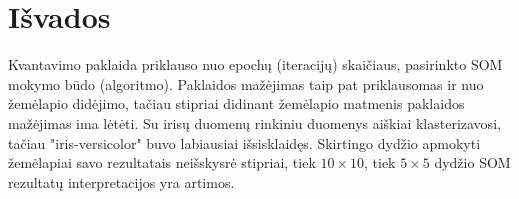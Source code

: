 \documentclass{VUMIFPSbakalaurinis}
\begin{document}
\begin{table}[]
  \centering
  \caption{1 mokymo būdu mokyto 10x10 dydžio SOM žemėlapis po 1000 epochų}{
  }
  \label{tab:10x10-1}
\end{table}


\section{Išvados}

Kvantavimo paklaida priklauso nuo epochų (iteracijų) skaičiaus,
pasirinkto SOM mokymo būdo (algoritmo). Paklaidos mažėjimas 
taip pat priklausomas ir nuo žemėlapio didėjimo, tačiau stipriai 
didinant žemėlapio matmenis paklaidos mažėjimas ima lėtėti. 
Su irisų duomenų rinkiniu duomenys aiškiai klasterizavosi,
tačiau "iris-versicolor" buvo labiausiai išsisklaidęs. Skirtingo
dydžio apmokyti žemėlapiai savo rezultatais neišskysrė stipriai,
tiek $10 \times 10$, tiek $5 \times 5$ dydžio SOM rezultatų 
interpretacijos yra artimos.
\end{document}
